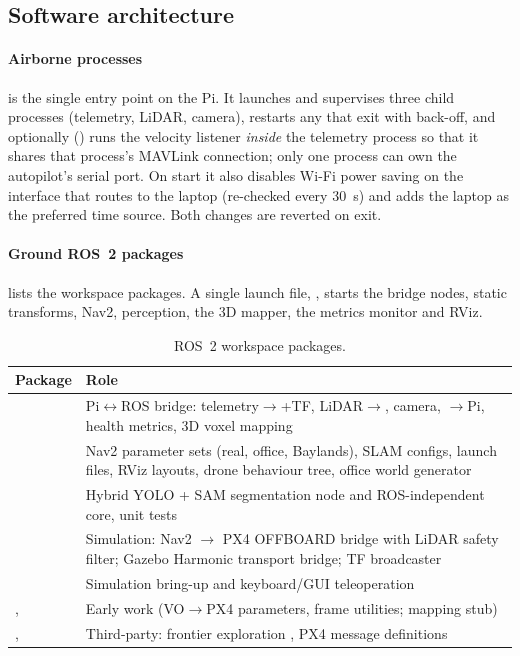 \subsection{Software architecture}

\paragraph{Airborne processes}  is the single entry point on
the Pi. It launches and supervises three child processes (telemetry, LiDAR, camera),
restarts any that exit with back-off, and optionally () runs the
velocity listener \emph{inside} the telemetry process so that it shares that process's
MAVLink connection; only one process can own the autopilot's serial port. On start it also disables Wi-Fi power saving on the interface that routes
to the laptop (re-checked every \SI{30}{\second}) and adds the laptop as the preferred
 time source. Both changes are reverted on exit.

\paragraph{Ground ROS~2 packages}  lists the workspace packages. A
single launch file, , starts the bridge nodes, static
transforms, Nav2, perception, the 3D mapper, the metrics monitor and RViz.

\begin{table}[H]
\centering\small
\caption{ROS~2 workspace packages.}
\label{tab:packages}
\begin{tabularx}{\textwidth}{l L}
\toprule
\textbf{Package} & \textbf{Role} \\
\midrule
{} & Pi$\leftrightarrow$ROS bridge: telemetry$\rightarrow$+TF, LiDAR$\rightarrow$, camera, $\rightarrow$Pi, health metrics, 3D voxel mapping \\
 & Nav2 parameter sets (real, office, Baylands), SLAM configs, launch files, RViz layouts, drone behaviour tree, office world generator \\
 & Hybrid YOLO + SAM segmentation node and ROS-independent core, unit tests \\
 & Simulation: Nav2 $\rightarrow$ PX4 OFFBOARD bridge with LiDAR safety filter; Gazebo Harmonic transport bridge; TF broadcaster \\
 & Simulation bring-up and keyboard/GUI teleoperation \\
,  & Early work (VO$\rightarrow$PX4 parameters, frame utilities; mapping stub) \\
,  & Third-party: frontier exploration \cite{hoerner2016mapmerge}, PX4 message definitions \\
\bottomrule
\end{tabularx}
\end{table}

